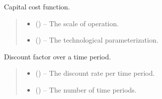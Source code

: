 \documentclass[letterpaper,10pt,english]{sphinxmanual}
\begin{document}
\begin{fulllineitems}
\label{\detokenize{technology:technology.pv_residential_simple.capital_cost}}
\pysigstartsignatures
{}
\pysigstopsignatures
\sphinxAtStartPar
Capital cost function.
\begin{quote}\begin{description}
\begin{itemize}
\item {} 
\sphinxAtStartPar
{} () – The scale of operation.

\item {} 
\sphinxAtStartPar
{} () – The technological parameterization.

\end{itemize}

\end{description}\end{quote}

\end{fulllineitems}


\begin{fulllineitems}
\label{\detokenize{technology:technology.pv_residential_simple.discount}}
\pysigstartsignatures
{}
\pysigstopsignatures
\sphinxAtStartPar
Discount factor over a time period.
\begin{quote}\begin{description}
\begin{itemize}
\item {} 
\sphinxAtStartPar
{} () – The discount rate per time period.

\item {} 
\sphinxAtStartPar
{} () – The number of time periods.

\end{itemize}

\end{description}\end{quote}

\end{fulllineitems}
\end{document}
